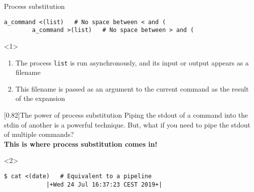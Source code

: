 \begin{frame}[fragile]{Process substitution}
    \begin{lstlisting}[style=MyBash, numbers=none, aboveskip=0mm]
        a_command <(list)   # No space between < and (
        a_command >(list)   # No space between > and (
    \end{lstlisting}
    \vspace{3mm}
    \begin{onlyenv}<1>
        \begin{enumerate}\small
            \item The process \texttt{list} is run asynchronously, and its input or output appears as a filename
            \item This filename is passed as an argument to the current command as the result of the expansion\\[0.3em]
        \end{enumerate}
        \begin{varblock}{}[0.82\textwidth]{The power of process substitution}
            Piping the stdout of a command into the stdin of another is a powerful technique.
            But, what if you need to pipe the stdout of multiple commands?\\
            \textbf{This is where process substitution comes in!}
        \end{varblock}
    \end{onlyenv}
    \begin{onlyenv}<2>
        \begin{lstlisting}[style=MyBash, aboveskip=0mm, xleftmargin=2mm, xrightmargin=0mm]
            $ cat <(date)   # Equivalent to a pipeline
            |+Wed 24 Jul 16:37:23 CEST 2019+|

\end{lstlisting}
\end{onlyenv}
\end{frame}
